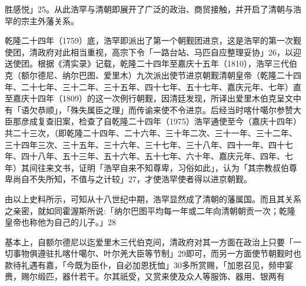 \vfill
\begin{BookNotes}
\end{BookNotes}

\noindent 胜感悦」25。从此浩罕与清朝即展开了广泛的政治、商贸接触，并开启了清朝与浩罕的宗主外藩关系。

乾隆二十四年（1759）底，浩罕即派出了第一个朝觐团进京，这是浩罕的第一次觐使团，清政府对此相当重视，高宗下令「一路台站、马匹自应整理妥协」26，以迎送使团。根据《清实录》记载，乾隆二十四年至嘉庆十五年（1810），浩罕三代伯克（额尔德尼、纳尔巴图、爱里木）九次派出使节进京朝觐清朝皇帝（乾隆二十四年、二十七年、三十二年、三十五年、四十七年、五十七年、嘉庆元年、七年）直至嘉庆十四年（1809）的这一次例行朝觐，因清廷发现，所译出爱里木伯克呈文中有「语欠恭顺」，「殊失属臣之理」而传谕来使不令进京。后经当时喀什噶尔参赞大臣那彦成复查旧案，检查了自乾隆二十四年（1975）浩罕通使至今（嘉庆十四年）共二十三次，（即乾隆二十四年、二十六年、三十年二次、三十一年、三十二年、三十四年三次、三十五年、三十六年、三十七年、三十八年、四十一年、四十七年、四十八年、五十三年、五十六年、五十七年、六十年、嘉庆元年、四年、七年）其间往来文书，证明「浩罕自来不知尊卑，习俗如此」，认为「其宗教叔伯尊卑尚自不失所知，不值与之计较」27，才使浩罕使者得以进京朝觐。

由以上史料所示，可知从十八世纪中期，浩罕显然成了清朝的藩属国。而且其关系之亲密，就如同霍渥斯所说:「纳尔巴图平均每一年或二年向清朝朝贡一次；乾隆皇帝也称他为自己的儿子。」28

基本上，自额尔德尼以迄爱里木三代伯克间，清政府对其一方面在政治上只要「一切事物俱遵驻扎喀什噶尔、叶尔羌大臣等节制」29即可，而另一方面使节朝觐时也款待礼遇有嘉，「今既为臣仆，自必加恩抚恤」30多所赏赐，「加恩召见，频申宴赉，赐尔缎匹，器什若干。尔其祇受，又赏来使及众人等服饰、器用、银两有

\vfill
\begin{BookNotes}
\end{BookNotes}

